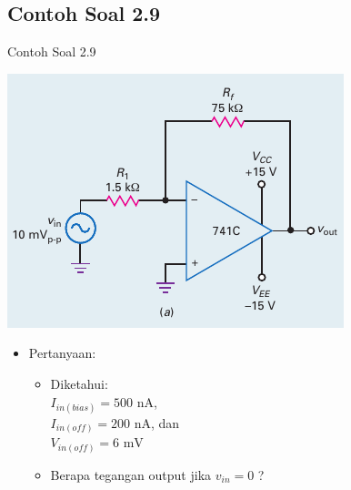\subsection{Contoh Soal 2.9}
\begin{frame}{Contoh Soal 2.9}
	\begin{multicols}{2}
		\begin{center}
			\includegraphics[width=\linewidth]{gambar/fig-16.17a}
		\end{center}
		\columnbreak
		\begin{itemize}
			\item Pertanyaan:
			\begin{itemize}
				\item Diketahui: \\
				$ I_{in(bias)} = 500 \text{ nA} $, \\
				$ I_{in(off)} = 200 \text{ nA}$, dan \\
				$ V_{in(off)} = 6 \text{ mV} $
				\item Berapa tegangan output jika $ v_{in} = 0 $ ?
			\end{itemize}
		\end{itemize}
	\end{multicols}
\end{frame}

